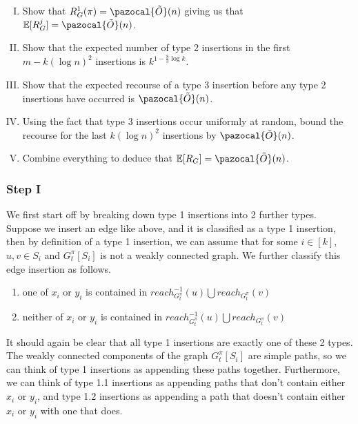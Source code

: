 \documentclass{article}
\begin{document}
\begin{enumerate}[I.]
    \item Show that $R_{G}^{1}(\pi)=\pazocal{\tilde{O}}(n)$ giving us that $\mathbb{E}[R_{G}^{j}]=\pazocal{\tilde{O}}(n)$.
    \item Show that the expected number of type 2 insertions in the first $m-k(\log n)^2$ insertions is $k^{1-\frac{8}{3}\log k}$.
    \item Show that the expected recourse of a type 3 insertion before any type 2 insertions have occurred is $\pazocal{\tilde{O}}(n)$.
    \item Using the fact that type 3 insertions occur uniformly at random, bound the recourse for the last $k(\log n)^2$ insertions by $\pazocal{\tilde{O}}(n) $.
    \item Combine everything to deduce that $\mathbb{E}[R_{G}]=\pazocal{\tilde{O}}(n)$.
\end{enumerate}

\subsubsection{Step I}

We first start off by breaking down type 1 insertions into 2 further types. Suppose we insert an edge like above, and it is classified as a type 1 insertion, then by definition of a type 1 insertion, we can assume that for some $i \in [k]$, $u,v \in S_{i}$ and $G_{t}^{\pi}[S_{i}]$ is not a weakly connected graph. We further classify this edge insertion as follows.

\begin{enumerate}[Type {1}.1]
    \item one of $x_{i}$ or $y_{i}$ is contained in $reach^{-1}_{G_{t}^{\pi}}(u) \bigcup reach_{G_{t}^{\pi}}(v)$
    \item neither of $x_{i}$ or $y_{i}$ is contained in $reach^{-1}_{G_{t}^{\pi}}(u) \bigcup reach_{G_{t}^{\pi}}(v)$
\end{enumerate}

It should again be clear that all type 1 insertions are exactly one of these 2 types. The weakly connected components of the graph $G_{t}^{\pi}[S_{i}]$ are simple paths, so we can think of type 1 insertions as appending these paths together. Furthermore, we can think of type 1.1 insertions as appending paths that don't contain either $x_{i}$ or $y_{i}$, and type 1.2 insertions as appending a path that doesn't contain either $x_{i}$ or $y_{i}$ with one that does. 
\end{document}
